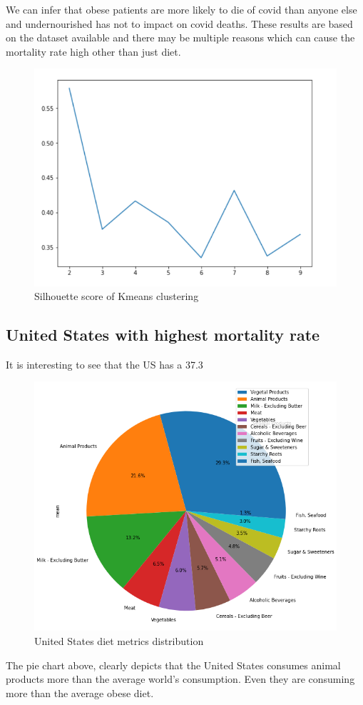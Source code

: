 \documentclass[journal,twoside,web]{ieeecolor}
\begin{document}
We can infer that obese patients are more likely to die of covid than anyone else and undernourished has not to impact on covid deaths. These results are based on the dataset available and there may be multiple reasons which can cause the mortality rate high other than just diet.

\begin{figure}[!t]
\centerline{\includegraphics[width=\columnwidth]{profig5.png}}
\caption{Silhouette score of Kmeans clustering}
\label{fig1}
\end{figure}

\subsection{United States with highest mortality rate}
It is interesting to see that the US has a 37.3%
\begin{figure}[!t]
\centerline{\includegraphics[width=\columnwidth]{profig7.png}}
\caption{United States diet metrics distribution}
\label{fig1}
\end{figure}
The pie chart above, clearly depicts that the United States consumes animal products more than the average world's consumption. Even they are consuming more than the average obese diet.
\end{document}
